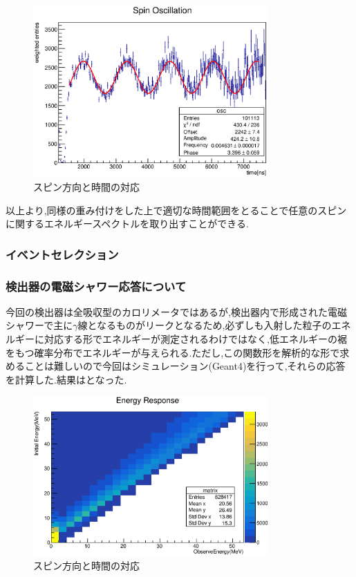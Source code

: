 \begin{figure}[bht]
  \centering
  \includegraphics[width=0.8\textwidth]{figure/hatano/oscillation.eps}
  \caption{スピン方向と時間の対応}
  \label{hatano_fig:oscillation}
\end{figure}

以上より,同様の重み付けをした上で適切な時間範囲をとることで任意のスピンに関するエネルギースペクトルを取り出すことができる.

\subsubsection{イベントセレクション}

\subsubsection{検出器の電磁シャワー応答について}
今回の検出器は全吸収型のカロリメータではあるが,検出器内で形成された電磁シャワーで主に$\gamma$線となるものがリークとなるため,必ずしも入射した粒子のエネルギーに対応する形でエネルギーが測定されるわけではなく,低エネルギーの裾をもつ確率分布でエネルギーが与えられる.ただし,この関数形を解析的な形で求めることは難しいので今回はシミュレーション(Geant4)を行って,それらの応答を計算した.結果はとなった.

\begin{figure}[bht]
  \centering
  \includegraphics[width=0.8\textwidth]{figure/hatano/response.eps}
  \caption{スピン方向と時間の対応}
  \label{hatano_fig:response}
\end{figure}

